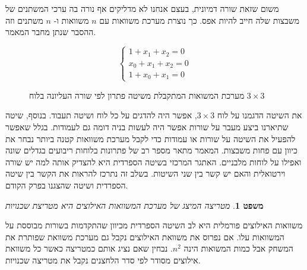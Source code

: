 \documentclass[12pt,leqno]{article}
\theoremstyle{theoremdd}
\newtheorem{theorem}{משפט}[section]
\begin{document}
משום שזאת שורה דמיונית, 
בעצם אנחנו לא מדליקים אף נורה בה ערכי המשתנים של משבצות
שלה חייב להיות אפס.
כך נוצרת מערכת משוואות עם 
$n$
משוואות ו- 
$n$
משתנים וזה ההסבר שנתן מחבר המאמר.
\begin{figure}[ht]
    \caption{
        מערכת המשואות המתקבלת משיטה פתרון לפי שורה העליונה
        בלוח 
        $3 \times 3$
    }
    \label{fig: eq system for spanish method 3 x 3}
    
    \[\begin{cases}
        1+x_{1}+x_{2}=0\\
        x_0 + x_1 + x_2 = 0\\
        1 + x_0 + x_1 = 0
        \end{cases} \]
\end{figure}

את השיטה הדגמנו על לוח 
$3 \times 3$,
אפשר היה להדגים על כל לוח ושיטה תעבוד.
בנוסף, שיטה שתיארנו ביצע מעבר על שורות אפשר היה לעשות בניה דומה גם לעמודות.
בגלל שאפשר להפעיל את השיטה על שורות או עמודות 
כדי לקבל מערכת משוואות קטנה ביותר נבחר 
את כיוון עם פחות משבצות.
המאמר 
\cite{B1}
מתאר מספר רב של פתרונות  בלוחות ריבועים בגדלים שונה ואפילו על לוחות מלבניים.
האתגר המרכזי בשיטה הספרדית היא להצדיק אותה למה יש שורה וירטואלית
והאם יש קשר בין שני השיטות.
בשלב זה נתרכז להראות את הקשר בין שיטה הספרדית ושיטה שהצגנו בפרק הקודם.
\begin{theorem}
    מטריצה המיצג של מערכת המשוואות האילוצים היא מטריצת שכנויות
\end{theorem}
משוואות האילוצים פורמלית היא לב השיטה הספרדית
מכיוון שהתקדמות בשורות מבוססת על המשוואות עלו.
אם נפרוס את משוואת האילוצים נקבל גם מערכת משוואת שפותרת את המשחק
אבל כמות המשואות הינה 
$n^2$.
נבחין שאם נציג אותם כמטריצה כאשר כל משוואת אילוצים מסודר לפי סדר הלחצנים נקבל את מטריצה שכנויות.
\end{document}
